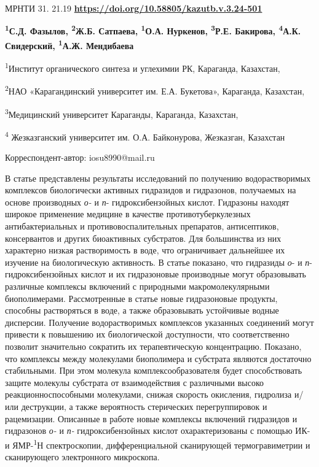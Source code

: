 \newpage
МРНТИ 31. 21.19
\hfill {\bfseries \href{https://doi.org/10.58805/kazutb.v.3.24-501}{https://doi.org/10.58805/kazutb.v.3.24-501}}


\begin{center}
{\bfseries \textsuperscript{1}С.Д. Фазылов\envelope, \textsuperscript{2}Ж.Б. Сатпаева, \textsuperscript{1}О.А. Нуркенов, \textsuperscript{3}Р.Е. Бакирова, \textsuperscript{4}А.К. Свидерский, \textsuperscript{1}А.Ж. Мендибаева}

\textsuperscript{1}Институт органического синтеза и углехимии РК,
Караганда, Казахстан,

\textsuperscript{2}НАО «Карагандинский университет им. Е.А. Букетова»,
Караганда, Казахстан,

\textsuperscript{3}Медицинский университет Караганды, Караганда,
Казахстан,

\textsuperscript{4} Жезказганский университет им. О.А. Байконурова,
Жезказган, Казахстан
\end{center}
\envelope Корреспондент-автор: iosu8990@mail.ru


В статье представлены результаты исследований по получению
водорастворимых комплексов биологически активных гидразидов и
гидразонов, получаемых на основе производных \emph{о-} и
\emph{п}- гидроксибензойных кислот. Гидразоны находят широкое применение
медицине в качестве противотуберкулезных антибактериальных и
противовоспалительных препаратов, антисептиков, консервантов и других
биоактивных субстратов. Для большинства из них характерно низкая
растворимость в воде, что ограничивает дальнейшее их изучение на
биологическую активность. В статье показано, что гидразиды \emph{о}- и
\emph{п}- гидроксибензойных кислот и их гидразоновые производные могут
образовывать различные комплексы включений с природными
макромолекулярными биополимерами. Рассмотренные в статье новые
гидразоновые продукты, способны растворяться в воде, а также
образовывать устойчивые водные дисперсии. Получение водорастворимых
комплексов указанных соединений могут привести к повышению их
биологической доступности, что соответственно позволит значительно
сократить их терапевтическую концентрацию. Показано, что комплексы между
молекулами биополимера и субстрата являются достаточно стабильными. При
этом молекула комплексообразователя будет способствовать защите молекулы
субстрата от взаимодействия с различными высоко реакционноспособными
молекулами, снижая скорость окисления, гидролиза и/или деструкции, а
также вероятность стерических перегруппировок и рацемизации. Описанные в
работе новые комплексы включений гидразидов и гидразонов \emph{о-} и
\emph{п- }гидроксибензойных кислот охарактеризованы с помощью ИК- и
ЯМР-\textsuperscript{1}Н спектроскопии, дифференциальной сканирующей
термогравиметрии и сканирующего электронного микроскопа.

